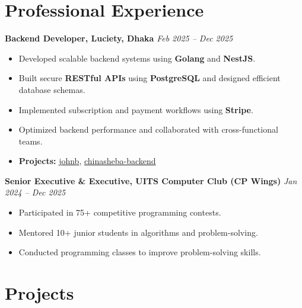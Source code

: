 \documentclass[11pt,a4paper]{article}
\begin{document}
\section*{Professional Experience}

\textbf{Backend Developer, Luciety, Dhaka} \hfill \textit{Feb 2025 -- Dec 2025}
\begin{itemize}[leftmargin=2em]
    \item Developed scalable backend systems using \textbf{Golang} and \textbf{NestJS}.
    \item Built secure \textbf{RESTful APIs} using \textbf{PostgreSQL} and designed efficient database schemas.
    \item Implemented subscription and payment workflows using \textbf{Stripe}.
    \item Optimized backend performance and collaborated with cross-functional teams.
    \item \textbf{Projects:} 
    \href{https://github.com/Binary-Mindz/johnb-backend-server}{johnb}, 
    \href{https://github.com/mahfuz15/chinasheba-backend/branches}{chinasheba-backend}
\end{itemize}

\textbf{Senior Executive \& Executive, UITS Computer Club (CP Wings)} \hfill \textit{Jan 2024 – Dec 2025}
\begin{itemize}[leftmargin=2em]
    \item Participated in 75+ competitive programming contests.
    \item Mentored 10+ junior students in algorithms and problem-solving.
    \item Conducted programming classes to improve problem-solving skills.
\end{itemize}

\section*{Projects}
\end{document}
